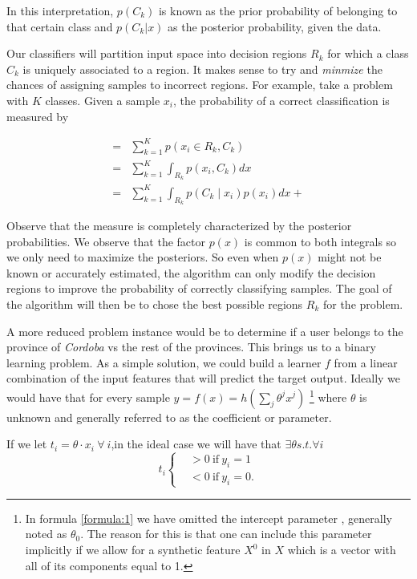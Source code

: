 In this interpretation, $p(C_k)$ is known as the prior probability of belonging to that certain class and $p(C_k|x)$ as the posterior probability, given the data. 

Our classifiers will partition input space into decision regions $R_k$ for which a class $C_k$ is uniquely associated to a region. It makes sense to try and \textit{minmize} the chances of assigning samples to incorrect regions. For example, take a problem with $K$ classes. Given a sample $x_i$, the probability of a correct classification is measured by 

\begin{equation}
\begin{split}
=  & \sum_{k=1}^{K} p(x_i \in R_k, C_k )  \\
=  & \sum_{k=1}^{K} \int_{R_k}p(x_i,C_k) dx \\
=  & \sum_{k=1}^{K} \int_{R_k}p(C_k \mid x_i) p(x_i) dx + 
\end{split}
\end{equation}

Observe that the measure is completely characterized by the posterior probabilities. We observe that the factor $p(x)$ is common to both integrals so we only need to maximize the posteriors. So even when $p(x)$ might not be known or accurately estimated, the algorithm can only modify the decision regions to improve the probability of correctly classifying samples.  The goal of the algorithm will then be to chose the best possible regions $R_k$ for the problem.
 
A more reduced problem instance would be to determine if a user belongs to the province of \textit{Cordoba} vs the rest of the provinces. This brings us to a binary learning problem. %
As a simple solution, we could build a learner $f$ from a linear combination of the input features that will predict the target output. Ideally we would have that for every sample $y = f(x) = h\left(\sum_{j}\theta^jx^j\right)$ \label{formula:1} \footnote{In formula \ref{formula:1} we have omitted the intercept parameter , generally noted as $\theta_0$. The reason for this is that one can include this parameter implicitly if we allow for a synthetic feature $X^0$ in $X$ which is a vector with all of its components equal to 1.  } where $\theta$ is unknown and generally referred to as the coefficient or parameter.

If we let $ t_i = \theta \cdot x_i  \ \forall \ i $,in the ideal case we will have that $\exists \theta s.t. \forall i $ 
\[
    t_i
      \begin{cases}
        &>0 \ \mbox{if} \ y_i=1 \\
        &<0 \ \mbox{if} \ y_i=0.
      \end{cases}
    \]


